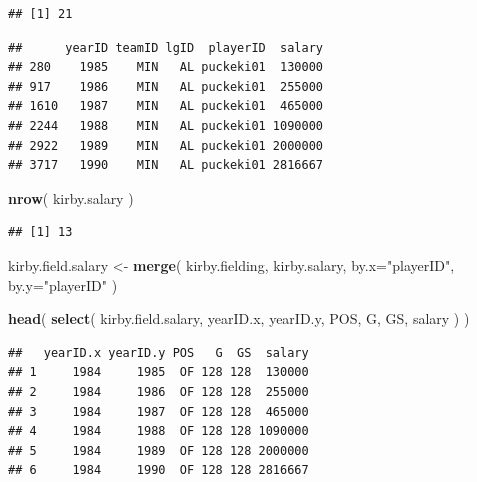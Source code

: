 \documentclass[]{book}
\newenvironment{Shaded}{\begin{snugshade}}{\end{snugshade}}
\newcommand{\DataTypeTok}[1]{\textcolor[rgb]{0.13,0.29,0.53}{#1}}
\newcommand{\KeywordTok}[1]{\textcolor[rgb]{0.13,0.29,0.53}{\textbf{#1}}}
\newcommand{\NormalTok}[1]{#1}
\newcommand{\OperatorTok}[1]{\textcolor[rgb]{0.81,0.36,0.00}{\textbf{#1}}}
\newcommand{\StringTok}[1]{\textcolor[rgb]{0.31,0.60,0.02}{#1}}
\theoremstyle{definition}
\theoremstyle{definition}
\theoremstyle{definition}
\theoremstyle{remark}
\begin{document}
\begin{verbatim}
## [1] 21
\end{verbatim}

\begin{Shaded}
\end{Shaded}

\begin{verbatim}
##      yearID teamID lgID  playerID  salary
## 280    1985    MIN   AL puckeki01  130000
## 917    1986    MIN   AL puckeki01  255000
## 1610   1987    MIN   AL puckeki01  465000
## 2244   1988    MIN   AL puckeki01 1090000
## 2922   1989    MIN   AL puckeki01 2000000
## 3717   1990    MIN   AL puckeki01 2816667
\end{verbatim}

\begin{Shaded}
\begin{Highlighting}[]
\KeywordTok{nrow}\NormalTok{( kirby.salary )}
\end{Highlighting}
\end{Shaded}

\begin{verbatim}
## [1] 13
\end{verbatim}

\begin{Shaded}
\begin{Highlighting}[]
\NormalTok{kirby.field.salary <-}\StringTok{ }\KeywordTok{merge}\NormalTok{( kirby.fielding, kirby.salary, }\DataTypeTok{by.x=}\StringTok{"playerID"}\NormalTok{, }\DataTypeTok{by.y=}\StringTok{"playerID"}\NormalTok{ )}

\KeywordTok{head}\NormalTok{( }\KeywordTok{select}\NormalTok{( kirby.field.salary, yearID.x, yearID.y,   POS,    G,  GS, salary ) )}
\end{Highlighting}
\end{Shaded}

\begin{verbatim}
##   yearID.x yearID.y POS   G  GS  salary
## 1     1984     1985  OF 128 128  130000
## 2     1984     1986  OF 128 128  255000
## 3     1984     1987  OF 128 128  465000
## 4     1984     1988  OF 128 128 1090000
## 5     1984     1989  OF 128 128 2000000
## 6     1984     1990  OF 128 128 2816667
\end{verbatim}
\end{document}

